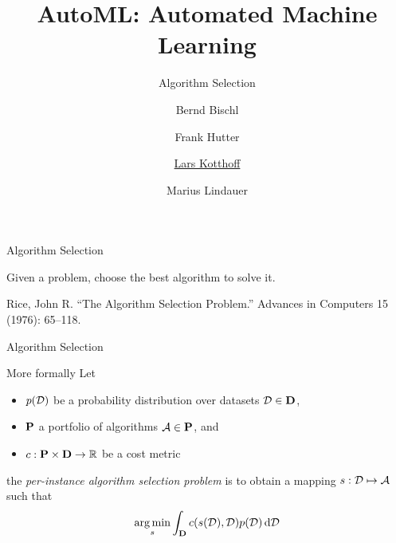 




\title[AutoML: Overview]{AutoML: Automated Machine Learning}
\subtitle{Algorithm Selection}
\author[Lars Kotthoff]{Bernd Bischl \and Frank Hutter \and \underline{Lars Kotthoff} \and Marius Lindauer}
\institute{}
\date{}




\def\blfootnote{}


	
	\maketitle
	


\begin{frame}[c]{Algorithm Selection}
    \begin{center}
        \Large{Given a problem, choose the best algorithm to solve it.}
    \end{center}
    \blfootnote{Rice, John R. ``The Algorithm Selection Problem.'' Advances in
    Computers 15 (1976): 65–118.}
\end{frame}

\begin{frame}[c]{Algorithm Selection}
\begin{block}{More formally}
        Let 
        \begin{itemize}
                \item $p(\mathcal{D})$ be a probability distribution over datasets $\mathcal{D} \in \mathbf{D}$,
                \item $\mathbf{P}$ a portfolio of algorithms $\mathcal{A} \in \mathbf{P}$, and
                \item $c: \mathbf{P} \times \mathbf{D} \rightarrow \mathbb{R}$ be a cost metric   
        \end{itemize}
        
        the \emph{per-instance algorithm selection problem} is to obtain a mapping 
        $s: \mathcal{D} \mapsto \mathcal{A}$ 
        such that
        $$\operatorname*{arg\,min}_{s} \int_{\mathbf{D}} c(s(\mathcal{D}),\mathcal{D}) p(\mathcal{D}) \mathop{}\!\mathrm{d}\mathcal{D}$$
\end{block}

\end{frame}

